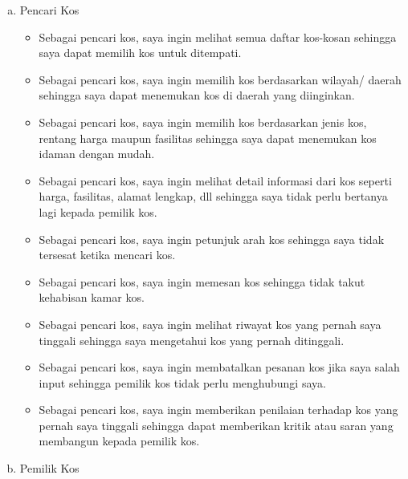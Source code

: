 		\begin{enumerate}[a.]
		
			\item Pencari Kos
			
				\begin{itemize}
					\item Sebagai pencari kos, saya ingin melihat semua daftar kos-kosan sehingga saya dapat memilih kos untuk ditempati.
					\item Sebagai pencari kos, saya ingin memilih kos berdasarkan wilayah/ daerah sehingga saya dapat menemukan kos di daerah yang diinginkan.
					\item Sebagai pencari kos, saya ingin memilih kos berdasarkan jenis kos, rentang harga maupun fasilitas sehingga saya dapat menemukan kos idaman dengan mudah.
					\item Sebagai pencari kos, saya ingin melihat detail informasi dari kos seperti harga, fasilitas, alamat lengkap, dll sehingga saya tidak perlu bertanya lagi kepada pemilik kos.
					\item Sebagai pencari kos, saya ingin petunjuk arah kos sehingga saya tidak tersesat ketika mencari kos.
					\item Sebagai pencari kos, saya ingin memesan kos sehingga tidak takut kehabisan kamar kos.
					\item Sebagai pencari kos, saya ingin melihat riwayat kos yang pernah saya tinggali sehingga saya mengetahui kos yang pernah ditinggali.
					\item Sebagai pencari kos, saya ingin membatalkan pesanan kos jika saya salah input sehingga pemilik kos tidak perlu menghubungi saya.
					\item Sebagai pencari kos, saya ingin memberikan penilaian terhadap kos yang pernah saya tinggali sehingga dapat memberikan kritik atau saran yang membangun kepada pemilik kos.
				\end{itemize}
			
			\item Pemilik Kos
			

\end{enumerate}
